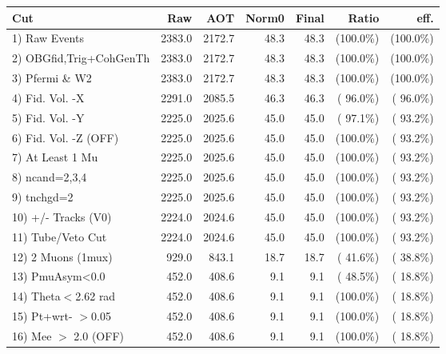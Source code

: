  \begin{table}[h!]\centering
 \begin{tabular}{||l||r|r|r|r|r|r||}
 \hline
 \hline
 Cut & Raw & AOT & Norm0 & Final & Ratio & eff.       \\
 \hline
  1) Raw Events           &       2383.0 &       2172.7 &         48.3 &         48.3 & (100.0\%) & (100.0\%) \\
  2) OBGfid,Trig+CohGenTh &       2383.0 &       2172.7 &         48.3 &         48.3 & (100.0\%) & (100.0\%) \\
  3) Pfermi \& W2         &       2383.0 &       2172.7 &         48.3 &         48.3 & (100.0\%) & (100.0\%) \\
  4) Fid. Vol. -X         &       2291.0 &       2085.5 &         46.3 &         46.3 & ( 96.0\%) & ( 96.0\%) \\
  5) Fid. Vol. -Y         &       2225.0 &       2025.6 &         45.0 &         45.0 & ( 97.1\%) & ( 93.2\%) \\
  6) Fid. Vol. -Z (OFF)   &       2225.0 &       2025.6 &         45.0 &         45.0 & (100.0\%) & ( 93.2\%) \\
  7) At Least 1 Mu        &       2225.0 &       2025.6 &         45.0 &         45.0 & (100.0\%) & ( 93.2\%) \\
  8) ncand=2,3,4          &       2225.0 &       2025.6 &         45.0 &         45.0 & (100.0\%) & ( 93.2\%) \\
  9) tnchgd=2             &       2225.0 &       2025.6 &         45.0 &         45.0 & (100.0\%) & ( 93.2\%) \\
 10) +/- Tracks (V0)      &       2224.0 &       2024.6 &         45.0 &         45.0 & (100.0\%) & ( 93.2\%) \\
 11) Tube/Veto Cut        &       2224.0 &       2024.6 &         45.0 &         45.0 & (100.0\%) & ( 93.2\%) \\
 12) 2 Muons (1mux)       &        929.0 &        843.1 &         18.7 &         18.7 & ( 41.6\%) & ( 38.8\%) \\
 13) PmuAsym<0.0          &        452.0 &        408.6 &          9.1 &          9.1 & ( 48.5\%) & ( 18.8\%) \\
 14) Theta$<$2.62 rad     &        452.0 &        408.6 &          9.1 &          9.1 & (100.0\%) & ( 18.8\%) \\
 15) Pt+wrt- $>$0.05      &        452.0 &        408.6 &          9.1 &          9.1 & (100.0\%) & ( 18.8\%) \\
 16) Mee $>$ 2.0  (OFF)   &        452.0 &        408.6 &          9.1 &          9.1 & (100.0\%) & ( 18.8\%) \\

\end{tabular}
\end{table}
